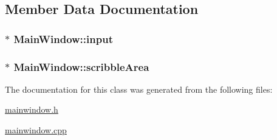 \subsection{Member Data Documentation}
\hypertarget{classMainWindow_a5d71f98f9f6b23c05835a8aa22dd0ac3}{
\subsubsection[{input}]{$\ast$ {\bf MainWindow::input}}}
\label{classMainWindow_a5d71f98f9f6b23c05835a8aa22dd0ac3}
\hypertarget{classMainWindow_a2a7ec082e8fbb0d6603f7ecef46ec13e}{
\subsubsection[{scribbleArea}]{$\ast$ {\bf MainWindow::scribbleArea}}}
\label{classMainWindow_a2a7ec082e8fbb0d6603f7ecef46ec13e}


The documentation for this class was generated from the following files:\begin{DoxyCompactItemize}
\item 
\hyperlink{mainwindow_8h}{mainwindow.h}\item 
\hyperlink{mainwindow_8cpp}{mainwindow.cpp}\end{DoxyCompactItemize}
